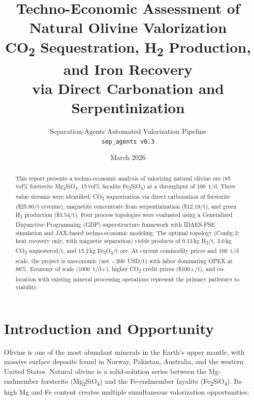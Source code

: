 \documentclass[11pt,a4paper]{article}
\title{\textbf{Techno-Economic Assessment of\\Natural Olivine Valorization}\\[8pt]
\large CO\textsubscript{2} Sequestration, H\textsubscript{2} Production, and Iron Recovery\\via Direct Carbonation and Serpentinization}
\author{Separation-Agents Automated Valorization Pipeline\\
\texttt{sep\_agents v0.3}}
\date{March 2026}
\begin{document}
\maketitle

\begin{abstract}
This report presents a techno-economic analysis of valorizing natural olivine ore (85\,vol\% forsterite Mg\textsubscript{2}SiO\textsubscript{4}, 15\,vol\% fayalite Fe\textsubscript{2}SiO\textsubscript{4}) at a throughput of \SI{100}{t/d}.
Three value streams were identified: CO\textsubscript{2} sequestration via direct carbonation of forsterite (\$25.80/t revenue), magnetite concentrate from serpentinization (\$12.19/t), and green H\textsubscript{2} production (\$3.54/t).
Four process topologies were evaluated using a Generalized Disjunctive Programming (GDP) superstructure framework with IDAES-PSE simulation and JAX-based techno-economic modeling.
The optimal topology (Config-2: heat recovery only, with magnetic separation) yields products of 0.13\,kg H\textsubscript{2}/t, 3.0\,kg CO\textsubscript{2} sequestered/t, and 15.2\,kg Fe\textsubscript{3}O\textsubscript{4}/t ore.
At current commodity prices and \SI{100}{t/d} scale, the project is uneconomic (net $-$\SI{200}{USD/t}) with labor dominating OPEX at 86\%.
Economy of scale (\SI{1000}{t/d}+), higher CO\textsubscript{2} credit prices (\$100+/t), and co-location with existing mineral processing operations represent the primary pathways to viability.
\end{abstract}

\tableofcontents
\newpage

\section{Introduction and Opportunity}

Olivine is one of the most abundant minerals in the Earth's upper mantle, with massive surface deposits found in Norway, Pakistan, Australia, and the western United States.
Natural olivine is a solid-solution series between the Mg-endmember forsterite (Mg\textsubscript{2}SiO\textsubscript{4}) and the Fe-endmember fayalite (Fe\textsubscript{2}SiO\textsubscript{4}).
Its high Mg and Fe content creates multiple simultaneous valorization opportunities:
\end{document}
